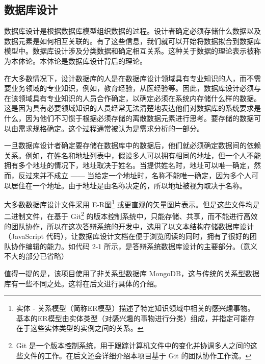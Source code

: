 \subsection{数据库设计}

数据库设计是根据数据库模型组织数据的过程。设计者确定必须存储什么数据以及数据元素是如何相互关联的。有了这些信息，我们就可以开始将数据拟合到数据库模型中。数据库设计涉及分类数据和确定相互关系。这种关于数据的理论表示被称为本体论。本体论是数据库设计背后的理论。

在大多数情况下，设计数据库的人是在数据库设计领域具有专业知识的人，而不需要业务领域的专业知识，例如，教育经验，从医经验等。因此，数据库设计必须与在该领域具有专业知识的人员合作确定，以确定必须在系统内存储什么样的数据。这是因为具有必要领域知识的人员经常无法清楚地表达他们对数据库的系统要求是什么，因为他们不习惯于根据必须存储的离散数据元素进行思考。要存储的数据可以由需求规格确定。这个过程通常被认为是需求分析的一部分。

一旦数据库设计者确定要存储在数据库中的数据后，他们就必须确定数据间的依赖关系。例如，在姓名和地址列表中，假设多人可以拥有相同的地址，但一个人不能拥有多个地址的情况下，地址取决于姓名。当提供姓名时，地址可以唯一确定，然而，反过来并不成立 —— 当给定一个地址时，名称不能唯一确定，因为多个人可以居住在一个地址。由于地址是由名称决定的，所以地址被视为取决于名称。

大多数数据库设计文件采用 
E-R图\footnote{实体 - 关系模型（简称ER模型）描述了特定知识领域中相关的感兴趣事物。基本的ER模型由实体类型（对感兴趣的事物进行分类）组成，并指定可能存在于这些实体类型的实例之间的关系。}
或更直观的矢量图片表示。但是这些文件均是二进制文件，在基于 
Git\footnote{Git 是一个版本控制系统，用于跟踪计算机文件中的变化并协调多人之间的这些文件的工作。在后文还会详细介绍本项目基于 Git 的团队协作工作流。} 
的版本控制系统中，只能存储、共享，而不能进行高效的团队协作，所以在这次答辩系统的开发中，选用了以文本结构存储数据库设计（JavaScript 代码），让数据库设计文档在便于浏览阅读的同时，拥有了很好的团队协作编辑的能力。如代码 2-1 所示，是答辩系统数据库设计的主要部分。（意义不大的部分已省略）

值得一提的是，该项目使用了非关系型数据库 MongoDB，这与传统的关系型数据库有一些不同之处。这将在后文进行具体的介绍。

\clearpage

